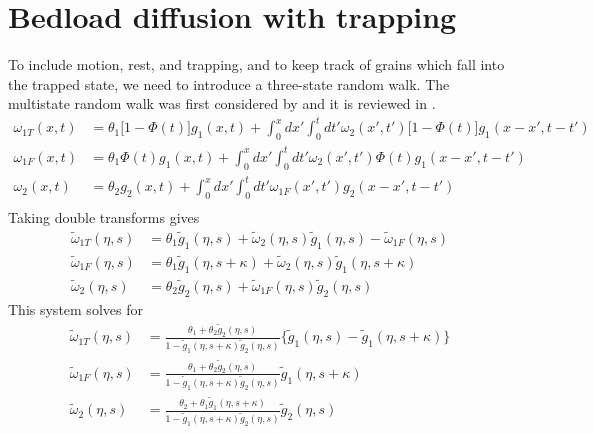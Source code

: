 \documentclass[]{agujournal2018}
\newcommand\om{\omega}
\newcommand\tom{\tilde{\omega}}
\newcommand\tg{\tilde{g}}
\begin{document}
\section{Bedload diffusion with trapping}
To include motion, rest, and trapping, and to keep track of grains which fall into the trapped state, we need to introduce a three-state random walk.
The multistate random walk was first considered by \citet{Weiss1976} and it is reviewed in \citet{Weiss1994}.
\begin{align}
\om_{1T}(x,t) &= \theta_1\big[1-\Phi(t)\big]g_1(x,t) + \int_0^x dx' \int_0^t dt' \om_2(x',t')\big[1-\Phi(t)\big]g_1(x-x',t-t')\\
\om_{1F}(x,t) &= \theta_1\Phi(t)g_1(x,t) + \int_0^x dx' \int_0^t dt' \om_2(x',t') \Phi(t) g_1(x-x',t-t')\\
\om_2(x,t) &= \theta_2 g_2(x,t) + \int_0^x dx' \int_0^t dt' \om_{1F}(x',t')g_2(x-x',t-t')\\
\end{align}
Taking double transforms gives
\begin{align}
\tom_{1T}(\eta,s) &= \theta_1 \tg_1(\eta,s) + \tom_2(\eta,s)\tg_1(\eta,s)-\tom_{1F}(\eta,s) \\
\tom_{1F}(\eta,s) &= \theta_1\tg_1(\eta,s+\kappa) + \tom_2(\eta,s)\tg_1(\eta,s+\kappa)\\
\tom_2(\eta,s) &= \theta_2 \tg_2(\eta,s) + \tom_{1F}(\eta,s)\tg_2(\eta,s)
\end{align}
This system solves for 
\begin{align}
\tom_{1T}(\eta,s) &= \frac{\theta_1 + \theta_2 \tg_2(\eta,s)}{1-\tg_1(\eta,s+\kappa)\tg_2(\eta,s)}\big\{\tg_1(\eta,s)-\tg_1(\eta,s+\kappa) \big\} \\
\tom_{1F}(\eta,s) &= \frac{\theta_1 + \theta_2 \tg_2(\eta,s)}{1-\tg_1(\eta,s+\kappa)\tg_2(\eta,s)}\tg_1(\eta,s+\kappa)\\
\tom_{2}(\eta,s) &= \frac{\theta_2 + \theta_1 \tg_1(\eta,s+\kappa)}{1-\tg_1(\eta,s+\kappa)\tg_2(\eta,s)}\tg_2(\eta,s)\\
\end{align}
\end{document}

